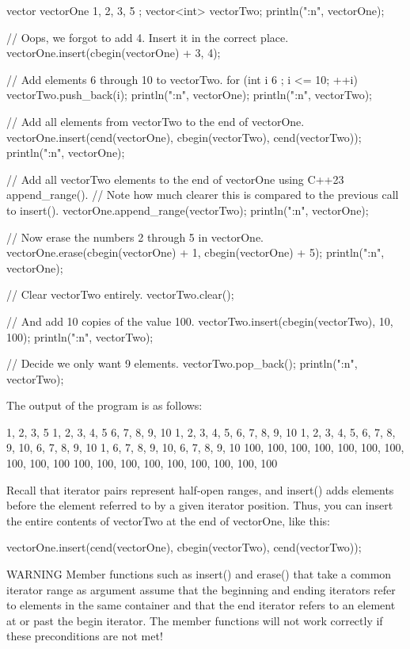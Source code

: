 \begin{cpp}
vector vectorOne { 1, 2, 3, 5 };
vector<int> vectorTwo;
println("{:n}", vectorOne);

// Oops, we forgot to add 4. Insert it in the correct place.
vectorOne.insert(cbegin(vectorOne) + 3, 4);

// Add elements 6 through 10 to vectorTwo.
for (int i { 6 }; i <= 10; ++i) {
    vectorTwo.push_back(i);
}
println("{:n}", vectorOne);
println("{:n}", vectorTwo);

// Add all elements from vectorTwo to the end of vectorOne.
vectorOne.insert(cend(vectorOne), cbegin(vectorTwo), cend(vectorTwo));
println("{:n}", vectorOne);

// Add all vectorTwo elements to the end of vectorOne using C++23 append_range().
// Note how much clearer this is compared to the previous call to insert().
vectorOne.append_range(vectorTwo);
println("{:n}", vectorOne);

// Now erase the numbers 2 through 5 in vectorOne.
vectorOne.erase(cbegin(vectorOne) + 1, cbegin(vectorOne) + 5);
println("{:n}", vectorOne);

// Clear vectorTwo entirely.
vectorTwo.clear();

// And add 10 copies of the value 100.
vectorTwo.insert(cbegin(vectorTwo), 10, 100);
println("{:n}", vectorTwo);

// Decide we only want 9 elements.
vectorTwo.pop_back();
println("{:n}", vectorTwo);
\end{cpp}

The output of the program is as follows:

\begin{shell}
1, 2, 3, 5
1, 2, 3, 4, 5
6, 7, 8, 9, 10
1, 2, 3, 4, 5, 6, 7, 8, 9, 10
1, 2, 3, 4, 5, 6, 7, 8, 9, 10, 6, 7, 8, 9, 10
1, 6, 7, 8, 9, 10, 6, 7, 8, 9, 10
100, 100, 100, 100, 100, 100, 100, 100, 100, 100
100, 100, 100, 100, 100, 100, 100, 100, 100
\end{shell}

Recall that iterator pairs represent half-open ranges, and insert() adds elements before the element referred to by a given iterator position. Thus, you can insert the entire contents of vectorTwo at the end of vectorOne, like this:

\begin{cpp}
vectorOne.insert(cend(vectorOne), cbegin(vectorTwo), cend(vectorTwo));
\end{cpp}

\begin{myWarning}{WARNING}
Member functions such as insert() and erase() that take a common iterator range as argument assume that the beginning and ending iterators refer to elements in the same container and that the end iterator refers to an element at or past the begin iterator. The member functions will not work correctly if these preconditions are not met!
\end{myWarning}

